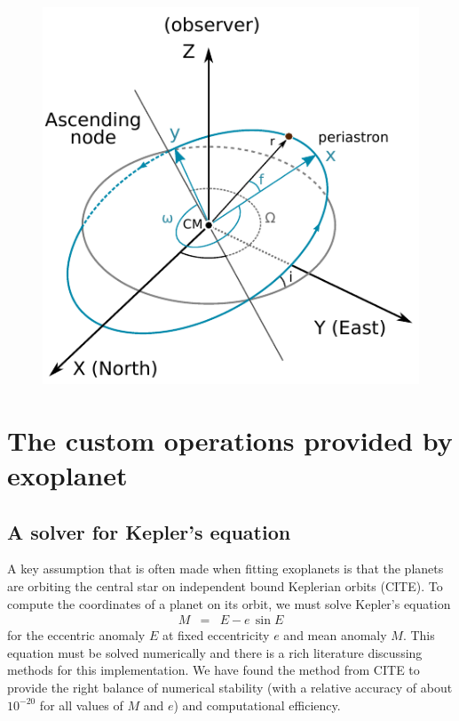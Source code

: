 \documentclass[modern]{aastex62}
\begin{document}
\begin{figure}[htbp]
\begin{centering}
\includegraphics{figures/orbit3D.pdf}
\end{centering}
\end{figure}

\section{The custom operations provided by exoplanet}

\subsection{A solver for Kepler's equation}

A key assumption that is often made when fitting exoplanets is that the
planets are orbiting the central star on independent bound Keplerian orbits
(CITE).
To compute the coordinates of a planet on its orbit, we must solve Kepler's
equation
\begin{eqnarray}
M &=& E - e\,\sin E
\end{eqnarray}
for the eccentric anomaly $E$ at fixed eccentricity $e$ and mean anomaly $M$.
This equation must be solved numerically and there is a rich literature
discussing methods for this implementation.
We have found the method from CITE to provide the right balance of numerical
stability (with a relative accuracy of about $10^{-20}$ for all values of $M$
and $e$) and computational efficiency.
\end{document}
